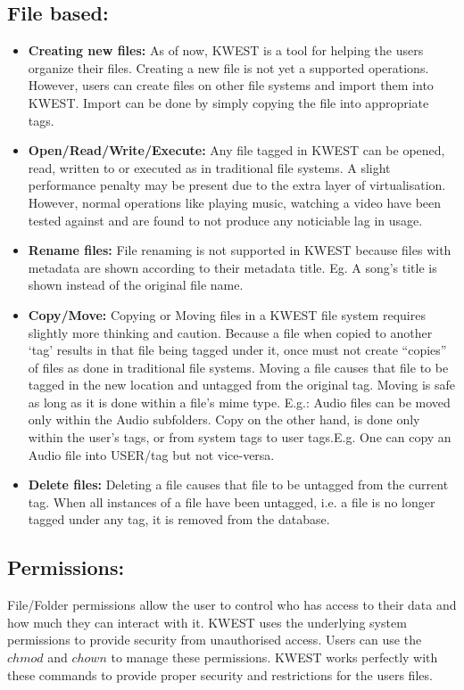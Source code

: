 \subsection{File based:}
\begin{itemize}
\item \textbf{Creating new files:}
As of now, KWEST is a tool for helping the users organize their files. Creating a new file is not yet a supported operations. However, users can create files on other file systems and import them into KWEST. Import can be done by simply copying the file into appropriate tags.
\item \textbf{Open/Read/Write/Execute:}
Any file tagged in KWEST can be opened, read, written to or executed as in traditional file systems. A slight performance penalty may be present due to the extra layer of virtualisation. However, normal operations like playing music, watching a video have been tested against and are found to not produce any noticiable lag in usage.
\item \textbf{Rename files:}
File renaming is not supported in KWEST because files with metadata are shown according to their metadata title. \newline
Eg. A song's title is shown instead of the original file name. 
\item \textbf{Copy/Move:}
Copying or Moving files in a KWEST file system requires slightly more thinking and caution. Because a file when copied to another `tag' results in that file being tagged under it, once must not create ``copies'' of files as done in traditional file systems. Moving a file causes that file to be tagged in the new location and untagged from the original tag. Moving is safe as long as it is done within a file's mime type. \newline
E.g.: Audio files can be moved only within the Audio subfolders. Copy on the other hand, is done only within the user's tags, or from system tags to user tags.E.g. One can copy an Audio file into USER/tag but not vice-versa.
\item \textbf{Delete files:}
Deleting a file causes that file to be untagged from the current tag. When all instances of a file have been untagged, i.e. a file is no longer tagged under any tag, it is removed from the database.
\end{itemize}

\subsection{Permissions:}
File/Folder permissions allow the user to control who has access to their data and how much they can interact with it. KWEST uses the underlying system permissions to provide security from unauthorised access. Users can use the $chmod$ and $chown$ to manage these permissions. KWEST works perfectly with these commands to provide proper security and restrictions for the users files.

